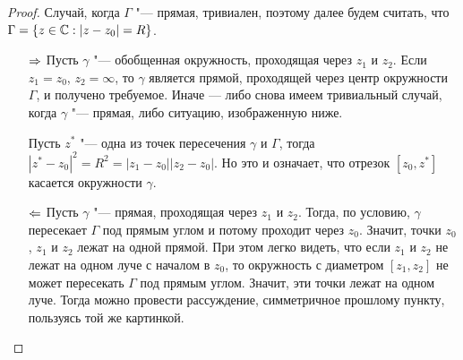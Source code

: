 \begin{proof}
	Случай, когда $\Gamma$ "--- прямая, тривиален, поэтому далее будем считать, что $\Gamma = \{z \in \mathbb{C}: |z - z_0| = R\}$.
	\begin{itemize}
		\item[$\Rightarrow$] Пусть $\gamma$ "--- обобщенная окружность, проходящая через $z_1$ и $z_2$. Если $z_1 = z_0$, $z_2 = \infty$, то $\gamma$ является прямой, проходящей через центр окружности $\Gamma$, и получено требуемое. Иначе --- либо снова имеем тривиальный случай, когда $\gamma$ "--- прямая, либо ситуацию, изображенную ниже.
		\begin{center}
		\end{center}
		
		Пусть $z^*$ "--- одна из точек пересечения $\gamma$ и $\Gamma$, тогда $|z^* - z_0|^2 = R^2 = |z_1 - z_0||z_2 - z_0|$. Но это и означает, что отрезок $[z_0, z^*]$ касается окружности $\gamma$.
		
		\item[$\Leftarrow$] Пусть $\gamma$ "--- прямая, проходящая через $z_1$ и $z_2$. Тогда, по условию, $\gamma$ пересекает $\Gamma$ под прямым углом и потому проходит через $z_0$. Значит, точки $z_0$, $z_1$ и $z_2$ лежат на одной прямой. При этом легко видеть, что если $z_1$ и $z_2$ не лежат на одном луче с началом в $z_0$, то окружность с диаметром $[z_1, z_2]$ не может пересекать $\Gamma$ под прямым углом. Значит, эти точки лежат на одном луче. Тогда можно провести рассуждение, симметричное прошлому пункту, пользуясь той же картинкой.\qedhere
	\end{itemize}
\end{proof}

